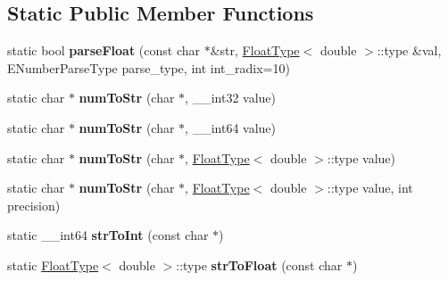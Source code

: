 \subsection*{Static Public Member Functions}
\begin{DoxyCompactItemize}
\item 
static bool {\bfseries parse\+Float} (const char $\ast$\&str, \hyperlink{struct_object_script_1_1_float_type}{Float\+Type}$<$ double $>$\+::type \&val, E\+Number\+Parse\+Type parse\+\_\+type, int int\+\_\+radix=10)\hypertarget{struct_object_script_1_1_o_s_1_1_utils_a55532b4d1562651386f8401cdbde9199}{}\label{struct_object_script_1_1_o_s_1_1_utils_a55532b4d1562651386f8401cdbde9199}

\item 
static char $\ast$ {\bfseries num\+To\+Str} (char $\ast$, \+\_\+\+\_\+int32 value)\hypertarget{struct_object_script_1_1_o_s_1_1_utils_afb02af1d12be337cb2133ab737fbf0ae}{}\label{struct_object_script_1_1_o_s_1_1_utils_afb02af1d12be337cb2133ab737fbf0ae}

\item 
static char $\ast$ {\bfseries num\+To\+Str} (char $\ast$, \+\_\+\+\_\+int64 value)\hypertarget{struct_object_script_1_1_o_s_1_1_utils_a38a05e2bb9821f8772f968111fb86e7d}{}\label{struct_object_script_1_1_o_s_1_1_utils_a38a05e2bb9821f8772f968111fb86e7d}

\item 
static char $\ast$ {\bfseries num\+To\+Str} (char $\ast$, \hyperlink{struct_object_script_1_1_float_type}{Float\+Type}$<$ double $>$\+::type value)\hypertarget{struct_object_script_1_1_o_s_1_1_utils_a6e418953de00a6e5b5eacb2b7c4af675}{}\label{struct_object_script_1_1_o_s_1_1_utils_a6e418953de00a6e5b5eacb2b7c4af675}

\item 
static char $\ast$ {\bfseries num\+To\+Str} (char $\ast$, \hyperlink{struct_object_script_1_1_float_type}{Float\+Type}$<$ double $>$\+::type value, int precision)\hypertarget{struct_object_script_1_1_o_s_1_1_utils_ae9057e2153d2a0c5bfc02c073649f6b5}{}\label{struct_object_script_1_1_o_s_1_1_utils_ae9057e2153d2a0c5bfc02c073649f6b5}

\item 
static \+\_\+\+\_\+int64 {\bfseries str\+To\+Int} (const char $\ast$)\hypertarget{struct_object_script_1_1_o_s_1_1_utils_a143f7d7927fa1bc8e47c3bf36f09c128}{}\label{struct_object_script_1_1_o_s_1_1_utils_a143f7d7927fa1bc8e47c3bf36f09c128}

\item 
static \hyperlink{struct_object_script_1_1_float_type}{Float\+Type}$<$ double $>$\+::type {\bfseries str\+To\+Float} (const char $\ast$)\hypertarget{struct_object_script_1_1_o_s_1_1_utils_ae6b675c6eb7982ce738c8dca954efae4}{}\label{struct_object_script_1_1_o_s_1_1_utils_ae6b675c6eb7982ce738c8dca954efae4}


\end{DoxyCompactItemize}
